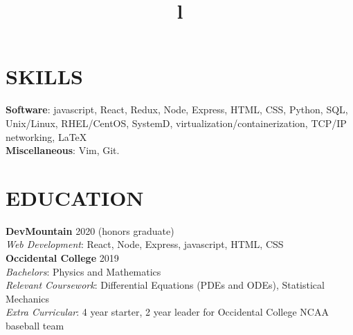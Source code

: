 \documentclass[margin]{res}
\begin{document}
\begin{resume}

\section{SKILLS}

\textbf{Software}: javascript, React, Redux, Node, Express, HTML, CSS, Python, SQL, Unix/Linux, RHEL/CentOS, SystemD, virtualization/containerization, TCP/IP networking, \LaTeX 
\\
\textbf{Miscellaneous}: Vim, Git.


\section{EDUCATION}
\textbf{DevMountain} 2020 (honors graduate)\\
{\sl Web Development}: React, Node, Express, javascript, HTML, CSS\\
\textbf{Occidental College} 2019\\
{\sl Bachelors}: Physics and Mathematics\\
{\sl Relevant Coursework}: Differential Equations (PDEs and ODEs), Statistical Mechanics\\
{\sl Extra Curricular}: 4 year starter, 2 year leader for Occidental College NCAA baseball team


\begin{format}
\title{l}\\
\\
\body\\
\end{format}


\end{resume}
\end{document}
